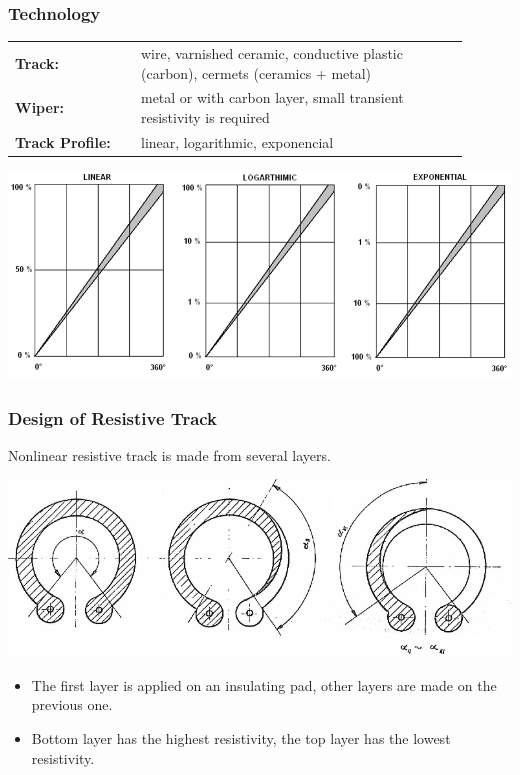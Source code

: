 \documentclass{beamer}
\begin{document}
	\begin{frame}
    \frametitle{Technology}
		\small
		\begin{center}
		\begin{tabular}{p{0.25\linewidth} p{0.65\linewidth}}
			\textbf{Track:} 					& wire, varnished ceramic, conductive plastic (carbon), cermets (ceramics + metal)\\
			\textbf{Wiper:} 					& metal or with carbon layer, small transient resistivity is required\\
			\textbf{Track Profile:} 	& linear, logarithmic, exponencial\\
		\end{tabular}
		\includegraphics[scale=0.4]{obr02_profily.png}
		\end{center}

  \end{frame}
	\begin{frame}
    \frametitle{Design of Resistive Track}
		Nonlinear resistive track is made from several layers.
		\begin{center}
		\includegraphics[scale=0.4]{obr05_vrstvyRDrahy.png}
		\end{center}
		\begin{itemize}
			\item The first layer is applied on an insulating pad, other layers are made on the previous one.
			\item Bottom layer has the highest resistivity, the top layer has the lowest resistivity.
		\end{itemize}
  \end{frame}
\end{document}

